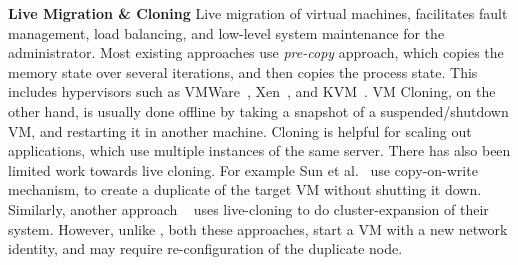 \noindent
\textbf{Live Migration \& Cloning}
Live migration of virtual machines, facilitates fault management, load balancing, and low-level system maintenance for the administrator.
Most existing approaches use \textit{pre-copy} approach, which copies the memory state over several iterations, and then copies the process state.
This includes hypervisors such as VMWare~\cite{nelson2005fast}, Xen~\cite{clark2005live}, and KVM~\cite{kivity2007kvm}.
VM Cloning, on the other hand, is usually done offline by taking a snapshot of a suspended/shutdown VM, and restarting it in another machine.
Cloning is helpful for scaling out applications, which use multiple instances of the same server.
There has also been limited work towards live cloning. 
For example Sun et al.~\cite{Sun:2009:FLC:1581383.1582148} use copy-on-write mechanism, to create a duplicate of the target VM without shutting it down.
Similarly, another approach ~\cite{gebhart2009dynamic} uses live-cloning to do cluster-expansion of their system.
However, unlike \parikshan, both these approaches, start a VM with a new network identity, and may require re-configuration of the duplicate node.
  